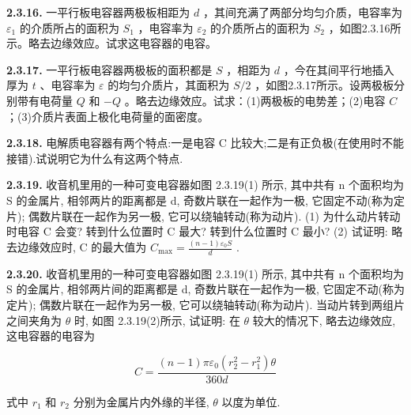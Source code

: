 \vfill
\newpage

\textbf{2.3.16.} 一平行板电容器两极板相距为 $d$ ，其间充满了两部分均匀介质，电容率为 $\varepsilon_{1}$ 的介质所占的面积为 $S_{1}$ ，电容率为 $\varepsilon_{2}$ 的介质所占的面积为 $S_{2}$ ，如图2.3.16所示。略去边缘效应。试求这电容器的电容。

\vfill
\newpage

\textbf{2.3.17.} 一平行板电容器两极板的面积都是 $S$ ，相距为 $d$ ，今在其间平行地插入厚为 $t$ 、电容率为 $\varepsilon$ 的均匀介质片，其面积为 $S / 2$ ，如图2.3.17所示。设两极板分别带有电荷量 $Q$ 和 $-Q$ 。略去边缘效应。试求：(1)两极板的电势差；(2)电容 $C$ ；(3)介质片表面上极化电荷量的面密度。

\vfill
\newpage

\textbf{2.3.18.} 电解质电容器有两个特点:一是电容 C 比较大;二是有正负极(在使用时不能接错).试说明它为什么有这两个特点.

\vfill
\newpage

\textbf{2.3.19.} 收音机里用的一种可变电容器如图 2.3.19(1) 所示, 其中共有 n 个面积均为 S 的金属片, 相邻两片的距离都是 d, 奇数片联在一起作为一极, 它固定不动(称为定片); 偶数片联在一起作为另一极, 它可以绕轴转动(称为动片). (1) 为什么动片转动时电容 C 会变? 转到什么位置时 C 最大? 转到什么位置时 C 最小? (2) 试证明: 略去边缘效应时, C 的最大值为 $\displaystyle C_{\max} = \frac{(n-1)\varepsilon_0 S}{d}$ .

\begin{center}
\end{center}

\vfill
\newpage

\textbf{2.3.20.} 收音机里用的一种可变电容器如图 2.3.19(1) 所示, 其中共有 n 个面积均为 S 的金属片, 相邻两片间的距离都是 d, 奇数片联在一起作为一极, 它固定不动(称为定片); 偶数片联在一起作为另一极, 它可以绕轴转动(称为动片). 当动片转到两组片之间夹角为 $\theta$ 时, 如图 2.3.19(2)所示, 试证明: 在 $\theta$ 较大的情况下, 略去边缘效应, 这电容器的电容为

\[
C = \frac {(n - 1) \pi \varepsilon_ {0} (r _ {2} ^ {2} - r _ {1} ^ {2}) \theta}{360d}
\]

式中 $r_{1}$ 和 $r_{2}$ 分别为金属片内外缘的半径, $\theta$ 以度为单位.

\begin{center}
\end{center}

\vfill
\newpage

